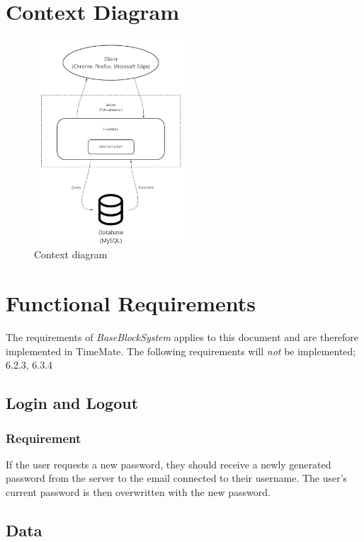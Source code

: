 \documentclass{article}
\begin{document}
\section{Context Diagram}
\begin{figure}[H]
\centering
\includegraphics[width=0.5\textwidth]{Flowchart_6.jpg}
\caption{Context diagram}
\end{figure}

\section{Functional Requirements}
\item The requirements of \emph{BaseBlockSystem} applies to this document and are therefore implemented in TimeMate. The following requirements will \emph{not} be implemented; 6.2.3, 6.3.4

\subsection{Login and Logout}


\subsubsection{Requirement}
If the user requests a new password, they should receive a newly generated password from the server to the email connected to their username. The user's current password is then overwritten with the new password.

\subsection{Data}
\end{document}

